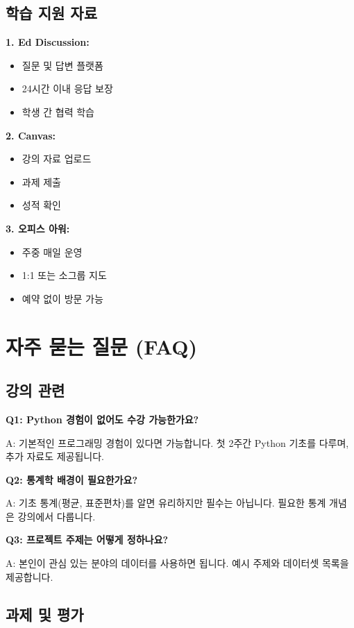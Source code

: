 \documentclass[12pt,a4paper]{article}
\begin{document}
\subsection{학습 지원 자료}

\textbf{1. Ed Discussion:}
\begin{itemize}
    \item 질문 및 답변 플랫폼
    \item 24시간 이내 응답 보장
    \item 학생 간 협력 학습
\end{itemize}

\textbf{2. Canvas:}
\begin{itemize}
    \item 강의 자료 업로드
    \item 과제 제출
    \item 성적 확인
\end{itemize}

\textbf{3. 오피스 아워:}
\begin{itemize}
    \item 주중 매일 운영
    \item 1:1 또는 소그룹 지도
    \item 예약 없이 방문 가능
\end{itemize}

\section{자주 묻는 질문 (FAQ)}

\subsection{강의 관련}

\textbf{Q1: Python 경험이 없어도 수강 가능한가요?}

A: 기본적인 프로그래밍 경험이 있다면 가능합니다. 첫 2주간 Python 기초를 다루며, 추가 자료도 제공됩니다.

\textbf{Q2: 통계학 배경이 필요한가요?}

A: 기초 통계(평균, 표준편차)를 알면 유리하지만 필수는 아닙니다. 필요한 통계 개념은 강의에서 다룹니다.

\textbf{Q3: 프로젝트 주제는 어떻게 정하나요?}

A: 본인이 관심 있는 분야의 데이터를 사용하면 됩니다. 예시 주제와 데이터셋 목록을 제공합니다.

\subsection{과제 및 평가}
\end{document}
